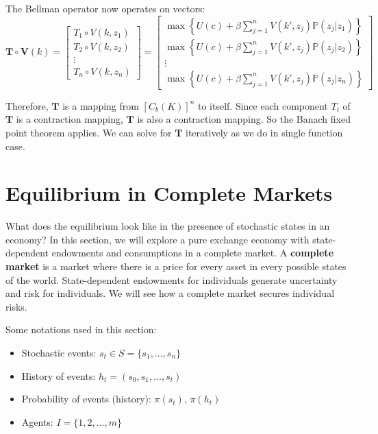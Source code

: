 \documentclass[10pt,a4]{article}
\begin{document}
The Bellman operator now operates on vectors:
\[
\mathbf{T}\circ \mathbf{V}(k) = 
    \begin{bmatrix}
        T_1 \circ V(k,z_1) \\
        T_2 \circ V(k,z_2) \\
        \vdots \\
        T_n \circ V(k,z_n)
    \end{bmatrix} = 
    \begin{bmatrix}
        \max\left\{ U(c) + \beta\sum_{j=1}^{n} V(k', z_j)\mathbb{P}(z_j|z_1) \right\} \\
        \max \left\{ U(c) + \beta\sum_{j=1}^{n} V(k', z_j)\mathbb{P}(z_j|z_2) \right\} \\
        \vdots \\
        \max \left\{ U(c) + \beta\sum_{j=1}^{n} V(k', z_j)\mathbb{P}(z_j|z_n) \right\}
    \end{bmatrix}
\]



Therefore, $\mathbf{T}$ is a mapping from $[C_b(K)]^n$ to itself. 
Since each component $T_i$ of $\mathbf{T}$ is a contraction mapping, $\mathbf{T}$ is also a contraction mapping. So the Banach fixed point theorem applies. We can solve for $\mathbf{T}$ iteratively as we do in single function case. 

\newpage

\section{Equilibrium in Complete
Markets}

{\label{610479}}

What does the equilibrium look like in the presence of stochastic states
in an economy? In this section, we will explore a pure exchange economy
with state-dependent endowments and consumptions in a complete market. A
\textbf{complete market} is a market where there is a price for every
asset in every possible states of the world. State-dependent endowments
for individuals generate uncertainty and risk for individuals. We will
see how a complete market secures individual risks.

\par\null

Some notations used in this section: 

\begin{itemize}
\item Stochastic events: $s_t \in S = \{s_1, ..., s_n\}$
\item History of events: $h_t = (s_0, s_1, ..., s_t)$
\item Probability of events (history): $\pi(s_t)$, $\pi(h_t)$
\item Agents: $I = \{1,2,..., m\}$
\end{itemize}
\end{document}
